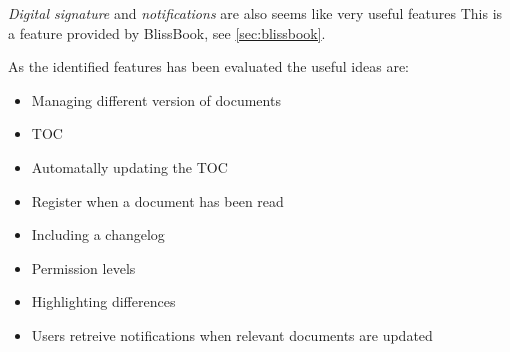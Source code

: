 \textit{Digital signature} and \textit{notifications} are also seems like very useful features
This is a feature provided by BlissBook, see \cref{sec:blissbook}.

As the identified features has been evaluated the useful ideas are:
\begin{itemize}
	\item Managing different version of documents
	\item TOC
	\item Automatally updating the TOC
	\item Register when a document has been read
	\item Including a changelog
	\item Permission levels
	\item Highlighting differences
	\item Users retreive notifications when relevant documents are updated
\end{itemize}

